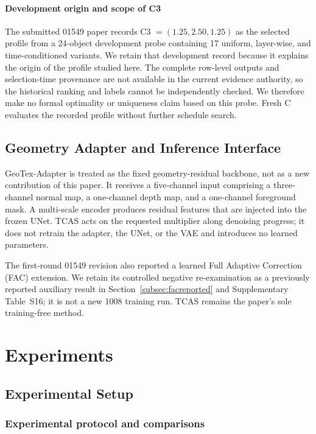 \documentclass[times,twocolumn,final]{elsarticle}
\begin{document}
\paragraph{Development origin and scope of C3}
The submitted 01549 paper records C3 $=(1.25,2.50,1.25)$ as the selected profile from a 24-object development probe containing 17 uniform, layer-wise, and time-conditioned variants. We retain that development record because it explains the origin of the profile studied here. The complete row-level outputs and selection-time provenance are not available in the current evidence authority, so the historical ranking and labels cannot be independently checked. We therefore make no formal optimality or uniqueness claim based on this probe. Fresh C evaluates the recorded profile without further schedule search.

\subsection{Geometry Adapter and Inference Interface}
\label{subsec:adapterimpl}

GeoTex-Adapter is treated as the fixed geometry-residual backbone, not as a new contribution of this paper. It receives a five-channel input comprising a three-channel normal map, a one-channel depth map, and a one-channel foreground mask. A multi-scale encoder produces residual features that are injected into the frozen UNet. TCAS acts on the requested multiplier along denoising progress; it does not retrain the adapter, the UNet, or the VAE and introduces no learned parameters.

The first-round 01549 revision also reported a learned Full Adaptive Correction (FAC) extension. We retain its controlled negative re-examination as a previously reported auxiliary result in Section~\ref{subsec:facreported} and Supplementary Table~S16; it is not a new 1008 training run. TCAS remains the paper's sole training-free method.

\section{Experiments}
\label{sec:experiments}

\subsection{Experimental Setup}
\label{subsec:setup}

\subsubsection{Experimental protocol and comparisons}
\end{document}
